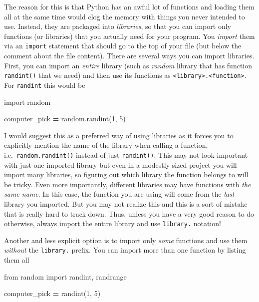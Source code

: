 \documentclass[
]{book}
\newenvironment{Shaded}{\begin{snugshade}}{\end{snugshade}}
\newcommand{\DecValTok}[1]{\textcolor[rgb]{0.00,0.00,0.81}{#1}}
\newcommand{\ImportTok}[1]{#1}
\newcommand{\NormalTok}[1]{#1}
\newcommand{\OperatorTok}[1]{\textcolor[rgb]{0.81,0.36,0.00}{\textbf{#1}}}
\begin{document}
The reason for this is that Python has an awful lot of functions and loading them all at the same time would clog the memory with things you never intended to use. Instead, they are packaged into \emph{libraries}, so that you can import only functions (or libraries) that you actually need for your program. You \emph{import} them via an \texttt{import} statement that should go to the top of your file (but below the comment about the file content). There are several ways you can import libraries. First, you can import an \emph{entire} library (such as \emph{random} library that has function \texttt{randint()} that we need) and then use its functions as \texttt{\textless{}library\textgreater{}.\textless{}function\textgreater{}}. For \texttt{randint} this would be

\begin{Shaded}
\begin{Highlighting}[]
\ImportTok{import}\NormalTok{ random}

\NormalTok{computer\_pick }\OperatorTok{=}\NormalTok{ random.randint(}\DecValTok{1}\NormalTok{, }\DecValTok{5}\NormalTok{)}
\end{Highlighting}
\end{Shaded}

I would suggest this as a preferred way of using libraries as it forces you to explicitly mention the name of the library when calling a function, i.e.~\texttt{random.randint()} instead of just \texttt{randint()}. This may not look important with just one imported library but even in a modestly-sized project you will import many libraries, so figuring out which library the function belongs to will be tricky. Even more importantly, different libraries may have functions with \emph{the same name}. In this case, the function you are using will come from the \emph{last} library you imported. But you may not realize this and this is a sort of mistake that is really hard to track down. Thus, unless you have a very good reason to do otherwise, always import the entire library and use \texttt{library.} notation!

Another and less explicit option is to import only \emph{some} functions and use them \emph{without} the \texttt{library.} prefix. You can import more than one function by listing them all

\begin{Shaded}
\begin{Highlighting}[]
\ImportTok{from}\NormalTok{ random }\ImportTok{import}\NormalTok{ randint, randrange}

\NormalTok{computer\_pick }\OperatorTok{=}\NormalTok{ randint(}\DecValTok{1}\NormalTok{, }\DecValTok{5}\NormalTok{)}
\end{Highlighting}
\end{Shaded}
\end{document}
